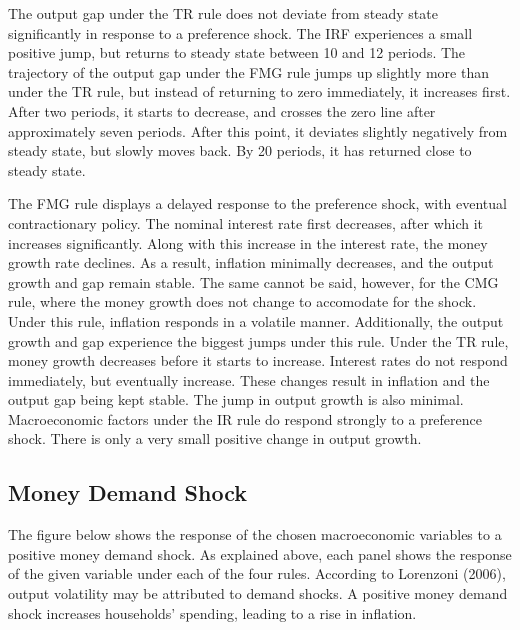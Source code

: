 \documentclass[11pt,preprint, authoryear]{elsarticle}
\numberwithin{equation}{section}
\numberwithin{figure}{section}
\numberwithin{table}{section}
\begin{document}
The output gap under the TR rule does not deviate from steady state
significantly in response to a preference shock. The IRF experiences a
small positive jump, but returns to steady state between 10 and 12
periods. The trajectory of the output gap under the FMG rule jumps up
slightly more than under the TR rule, but instead of returning to zero
immediately, it increases first. After two periods, it starts to
decrease, and crosses the zero line after approximately seven periods.
After this point, it deviates slightly negatively from steady state, but
slowly moves back. By 20 periods, it has returned close to steady state.

The FMG rule displays a delayed response to the preference shock, with
eventual contractionary policy. The nominal interest rate first
decreases, after which it increases significantly. Along with this
increase in the interest rate, the money growth rate declines. As a
result, inflation minimally decreases, and the output growth and gap
remain stable. The same cannot be said, however, for the CMG rule, where
the money growth does not change to accomodate for the shock. Under this
rule, inflation responds in a volatile manner. Additionally, the output
growth and gap experience the biggest jumps under this rule. Under the
TR rule, money growth decreases before it starts to increase. Interest
rates do not respond immediately, but eventually increase. These changes
result in inflation and the output gap being kept stable. The jump in
output growth is also minimal. Macroeconomic factors under the IR rule
do respond strongly to a preference shock. There is only a very small
positive change in output growth.

\hypertarget{money-demand-shock}{%
\subsection{Money Demand Shock}\label{money-demand-shock}}

The figure below shows the response of the chosen macroeconomic
variables to a positive money demand shock. As explained above, each
panel shows the response of the given variable under each of the four
rules. According to Lorenzoni (2006), output volatility may be
attributed to demand shocks. A positive money demand shock increases
households' spending, leading to a rise in inflation.
\end{document}
